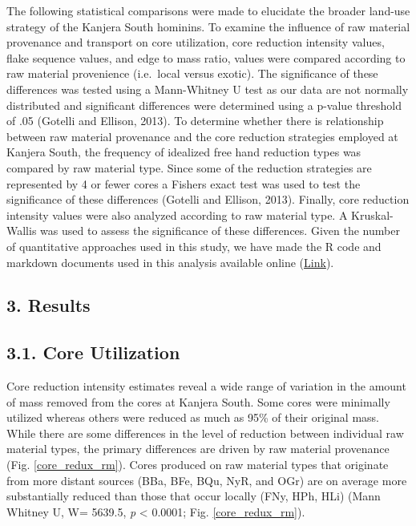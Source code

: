 \documentclass[]{elsarticle} %
\begin{document}
The following statistical comparisons were made to elucidate the broader
land-use strategy of the Kanjera South hominins. To examine the
influence of raw material provenance and transport on core utilization,
core reduction intensity values, flake sequence values, and edge to mass
ratio, values were compared according to raw material provenience
(i.e.~local versus exotic). The significance of these differences was
tested using a Mann-Whitney U test as our data are not normally
distributed and significant differences were determined using a p-value
threshold of .05 (Gotelli and Ellison, 2013). To determine whether there
is relationship between raw material provenance and the core reduction
strategies employed at Kanjera South, the frequency of idealized free
hand reduction types was compared by raw material type. Since some of
the reduction strategies are represented by 4 or fewer cores a Fishers
exact test was used to test the significance of these differences
(Gotelli and Ellison, 2013). Finally, core reduction intensity values
were also analyzed according to raw material type. A Kruskal-Wallis was
used to assess the significance of these differences. Given the number
of quantitative approaches used in this study, we have made the R code
and markdown documents used in this analysis available online
(\href{https://www.dropbox.com/home/Models_and_Runs/Kanjera\%20South}{Link}).

\hypertarget{results}{%
\subsection{3. Results}\label{results}}

\hypertarget{core-utilization}{%
\subsection{3.1. Core Utilization}\label{core-utilization}}

Core reduction intensity estimates reveal a wide range of variation in
the amount of mass removed from the cores at Kanjera South. Some cores
were minimally utilized whereas others were reduced as much as 95\% of
their original mass. While there are some differences in the level of
reduction between individual raw material types, the primary differences
are driven by raw material provenance (Fig. \ref{core_redux_rm}). Cores
produced on raw material types that originate from more distant sources
(BBa, BFe, BQu, NyR, and OGr) are on average more substantially reduced
than those that occur locally (FNy, HPh, HLi) (Mann Whitney U, W=
5639.5, \emph{p} \textless{} 0.0001; Fig. \ref{core_redux_rm}).
\end{document}
